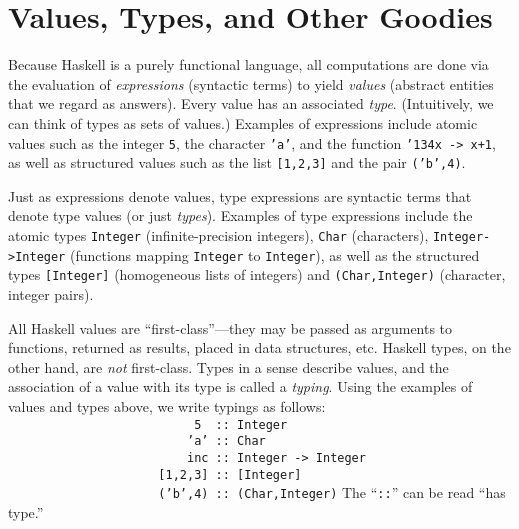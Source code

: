 

\section{Values, Types, and Other Goodies}
\label{tut-values-etc}

Because Haskell is a purely functional language, all computations are
done via the evaluation of {\em expressions} (syntactic terms) to
yield {\em values} (abstract entities that we regard as answers).
Every value has an associated 
{\em type}.  (Intuitively, we can think of types as sets of values.)
Examples of expressions include atomic values such as the integer \mbox{\tt 5},
the character \mbox{\tt 'a'}, and the function \mbox{\tt {\char'134}x\ ->\ x+1}, as well as
structured values such as the list \mbox{\tt [1,2,3]} and the pair \mbox{\tt ('b',4)}.

Just as expressions denote values, type expressions are
syntactic terms that denote type values (or just {\em types}).
Examples of type expressions include the atomic types \mbox{\tt Integer}
(infinite-precision integers), \mbox{\tt Char} (characters), \mbox{\tt Integer->Integer}
(functions mapping \mbox{\tt Integer} to \mbox{\tt Integer}), as well as the structured types
\mbox{\tt [Integer]} (homogeneous lists of integers) and \mbox{\tt (Char,Integer)}
(character, integer pairs).

All Haskell values are ``first-class''---they may be passed as
arguments to functions, returned as results, placed in data
structures, etc.  Haskell types, on the other hand, are {\em not}
first-class.  Types in a sense describe values, and the
association of a value with its type is called a {\em typing}.  Using
the examples of values and types above, we write typings as follows:
\bprog
\mbox{\tt \ \ \ \ \ \ \ \ \ \ \ \ \ \ \ \ \ \ \ \ \ \ \ \ \ \ 5\ \ ::\ Integer}\\
\mbox{\tt \ \ \ \ \ \ \ \ \ \ \ \ \ \ \ \ \ \ \ \ \ \ \ \ \ 'a'\ ::\ Char}\\
\mbox{\tt \ \ \ \ \ \ \ \ \ \ \ \ \ \ \ \ \ \ \ \ \ \ \ \ \ inc\ ::\ Integer\ ->\ Integer}\\
\mbox{\tt \ \ \ \ \ \ \ \ \ \ \ \ \ \ \ \ \ \ \ \ \ [1,2,3]\ ::\ [Integer]}\\
\mbox{\tt \ \ \ \ \ \ \ \ \ \ \ \ \ \ \ \ \ \ \ \ \ ('b',4)\ ::\ (Char,Integer)}
\eprog
The ``\mbox{\tt ::}'' can be read ``has type.''

